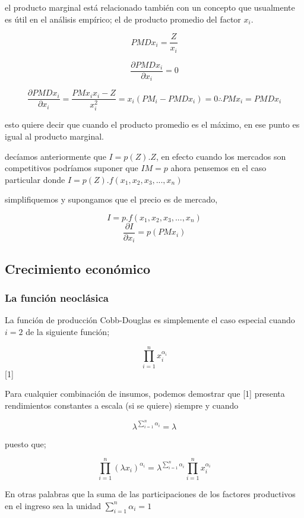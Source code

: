 \documentclass[12pt]{article}
\begin{document}
el producto marginal está relacionado también con un concepto  que usualmente es útil en el análisis empírico; el de producto promedio del factor $x_{i}$.

$$PMDx_{i}= \dfrac{Z}{x_{i}}$$

$$\dfrac{\partial PMDx_{i}}{\partial x_{i}}=0$$

$$\dfrac{\partial PMDx_{i}}{\partial x_{i}} = \dfrac{PMx_{i}x_{i}-Z}{x_{i}^{2}} = x_{i}(PM_{i}-PMDx_{i})=0 \therefore PMx_{i}=PMDx_{i}$$ 

esto quiere decir que cuando el producto promedio es el máximo, en ese punto es igual al producto marginal.

decíamos anteriormente que $I= p(Z).Z$, en efecto cuando los mercados son competitivos podríamos suponer que $IM=p$ ahora pensemos en el caso particular donde $I=p(Z).f(x_1,x_2,x_3,...,x_n)$ 

simplifiquemos y supongamos que el precio es de mercado, 

$$I=p.f(x_1,x_2,x_3,...,x_n)$$
$$\dfrac{\partial I}{\partial x_{i}}= p(PMx_{i})$$





\vspace*{0,9cm}

\subsection{Crecimiento económico}


\subsubsection{La función neoclásica}
La función de producción Cobb-Douglas es simplemente el caso especial cuando $i=2$ de la siguiente función;

$$\prod_{i=1}^n x_i^{\alpha_i}  $$ [1]

Para cualquier combinación de insumos, podemos demostrar que [1] presenta rendimientos constantes a escala (si se quiere) siempre y cuando 

 $$ \lambda^{\sum_{i=1}^n\alpha{_i}}=\lambda $$
 
 
puesto que; 



$$\prod_{i=1}^n \left(\lambda x_i \right)^{\alpha_i}=\lambda^{{\sum_{i=1}^n\alpha_i}}\prod_{i=1}^n x_i^{\alpha_i}$$
 
 
 
 
 En otras palabras que la suma de las participaciones de los factores productivos en el ingreso sea la unidad $\sum_{i=1}^n\alpha{_i}=1$
 
\end{document}
